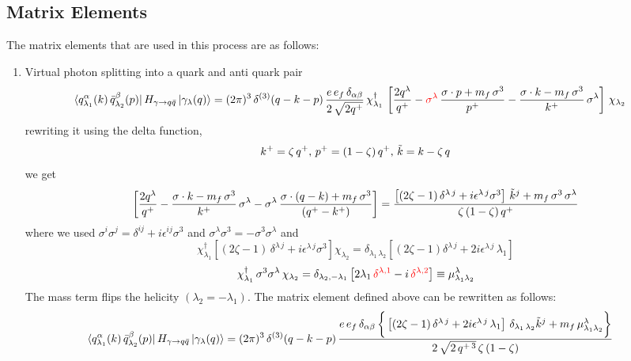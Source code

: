 \documentclass[9pt]{article}
\newcommand{\chg}[1]{{\color{red}#1}}
\numberwithin{equation}{section}
\begin{document}
\subsection{Matrix Elements}
The matrix elements that are used in this process are as follows:
\begin{enumerate}
\item Virtual photon splitting into a quark and anti quark pair
\begin{align}
    \bra{q^{\alpha}_{\lambda_{1}}(k)\,\Bar{q}^{\beta}_{\lambda_{2}}(p)}H_{\gamma\rightarrow q\Bar{q}}\ket{\gamma_{\lambda}(q)} & = (2\pi)^{3}\, \delta^{(3)}(q-k-p)\, \frac{e\,e_{f}\,\delta_{\alpha\beta}}{2\,\sqrt{2q^{+}}}\, \chi^{\dagger}_{\lambda_{1}}\,\left[\frac{2q^{\lambda}}{q^{+}}-\chg{\sigma^{\lambda}}\,\frac{\sigma\cdot p+m_{f}\,\sigma^{3}}{p^{+}}- \frac{\sigma\cdot k-m_{f}\,\sigma^{3}}{k^{+}}\,\sigma^{\lambda}\right]\,\chi_{\lambda_{2}}
\label{chg:phot}\end{align}
rewriting it using the delta function,
$$k^{+} = \zeta\,q^{+}, \, p^{+} = (1-\zeta)\,q^{+}, \, \Tilde{k} = k-\zeta\,q$$
we get
$$\left[\frac{2q^{\lambda}}{q^{+}}-\frac{\sigma\cdot k - m_{f}\,\sigma^{3}}{k^{+}}\,\sigma^{\lambda}-\sigma^{\lambda}\, \frac{\sigma\cdot (q-k)+m_{f}\,\sigma^{3}}{(q^{+}-k^{+})}\right] = \frac{\left[(2\zeta -1)\,\delta^{\lambda\,j} + i\epsilon^{\lambda\, j}\sigma^{3}\right]\,\Tilde{k}^{j}+m_{f}\,\sigma^{3}\,\sigma^{\lambda}}{\zeta\,(1-\zeta)\,q^{+}}$$
where we used $\sigma^{i}\sigma^{j} = \delta^{ij} +i\epsilon^{ij}\sigma^{3}$ and $\sigma^{\lambda}\sigma^{3} = - \sigma^{3}\sigma^{\lambda}$
and $$\chi^{\dagger}_{\lambda_{1}}\left[(2\zeta -1)\,\delta^{\lambda\,j} + i\epsilon^{\lambda\, j}\sigma^{3}\right]\chi_{\lambda_{2}} = \delta_{\lambda_{1}\,\lambda_{2}}\left[(2\zeta - 1)\delta^{\lambda\,j} +2i\epsilon^{\lambda\,j}\,\lambda_{1}\right]$$
\label{chg:mu1}$$\chi^{\dagger}_{\lambda_{1}}\,\sigma^{3}\sigma^{\lambda}\,\chi_{\lambda_{2}} = \delta_{\lambda_{2},-\lambda_{1}} \left[2\lambda_{1}\,\chg{\delta^{\lambda,1}} - i\,\chg{\delta^{\lambda,2}}\right] \equiv \mu^{\lambda}_{\lambda_{1}\lambda_{2}}$$
The mass term flips the helicity $(\lambda_{2} = -\lambda_{1})$. The matrix element defined above can be rewritten as follows:
\begin{align}
    \bra{q^{\alpha}_{\lambda_{1}}(k)\,\Bar{q}^{\beta}_{\lambda_{2}}(p)}H_{\gamma\rightarrow q\Bar{q}}\ket{\gamma_{\lambda}(q)} & = (2\pi)^{3}\, \delta^{(3)}(q-k-p)\, \frac{e\,e_{f}\,\delta_{\alpha\beta}\,\bigg\{\left[(2\zeta -1)\,\delta^{\lambda\,j}+2i\epsilon^{\lambda\,j}\,\lambda_{1}\right]\,\delta_{\lambda_{1}\,\lambda_{2}}\Tilde{k}^{j}+m_{f}\,\mu^{\lambda}_{\lambda_{1}\lambda_{2}}\bigg\}}{2\,\sqrt{2\,q^{+\,3}}\, \zeta\,(1-\zeta)}

\end{align}
\end{enumerate}
\end{document}
